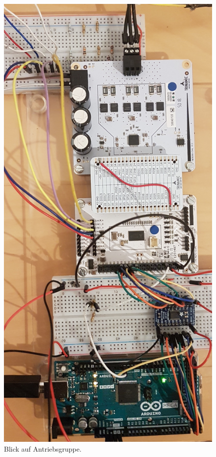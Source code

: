 
\begin{figure}[H]
	\centering
	\includegraphics[angle = 270, width=\textwidth]{graphics/4_Elektronik}
	\caption{Blick auf Antriebsgruppe.}
	\label{fig:4_Elektronik}
\end{figure}

